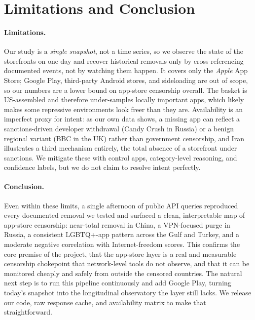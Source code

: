 \section{Limitations and Conclusion}\label{sec:conclusion}

\paragraph{Limitations.} Our study is a \emph{single snapshot}, not a time series,
so we observe the state of the storefronts on one day and recover historical
removals only by cross-referencing documented events, not by watching them happen.
It covers only the \emph{Apple} App Store; Google Play, third-party Android stores,
and sideloading are out of scope, so our numbers are a lower bound on app-store
censorship overall. The basket is US-assembled and therefore under-samples
locally important apps, which likely makes some repressive environments look freer
than they are. Availability is an imperfect proxy for intent: as our own data
shows, a missing app can reflect a sanctions-driven developer withdrawal (Candy
Crush in Russia) or a benign regional variant (BBC in the UK) rather than
government censorship, and Iran illustrates a third mechanism entirely, the total
absence of a storefront under sanctions. We mitigate these with control apps,
category-level reasoning, and confidence labels, but we do not claim to resolve
intent perfectly.

\paragraph{Conclusion.} Even within these limits, a single afternoon of public API
queries reproduced every documented removal we tested and surfaced a clean,
interpretable map of app-store censorship: near-total removal in China, a
VPN-focused purge in Russia, a consistent LGBTQ+-app pattern across the Gulf and
Turkey, and a moderate negative correlation with Internet-freedom scores. This
confirms the core premise of the project, that the app-store layer is a real and
measurable censorship chokepoint that network-level tools do not observe, and that
it can be monitored cheaply and safely from outside the censored countries. The
natural next step is to run this pipeline continuously and add Google Play, turning
today's snapshot into the longitudinal observatory the layer still lacks. We
release our code, raw response cache, and availability matrix to make that
straightforward.
